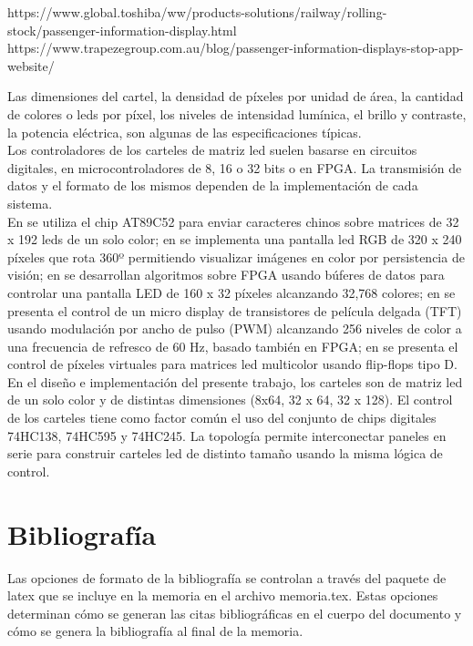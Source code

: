 https://www.global.toshiba/ww/products-solutions/railway/rolling-stock/passenger-information-display.html
https://www.trapezegroup.com.au/blog/passenger-information-displays-stop-app-website/

Las dimensiones del cartel, la densidad de píxeles por unidad de área, la cantidad de colores o leds por píxel, los niveles de intensidad lumínica, el brillo y contraste, la potencia eléctrica, son algunas de las especificaciones típicas.\\

 Los controladores de los carteles de matriz led suelen basarse en circuitos digitales, en microcontroladores de 8, 16 o 32 bits o en FPGA. La transmisión de datos y el formato de los mismos dependen de la implementación de cada sistema.  \\

En \cite{b1} se utiliza el chip AT89C52 para enviar caracteres chinos sobre matrices de 32 x 192 leds de un solo color; en \cite{b2} se implementa una pantalla led RGB de 320 x 240 píxeles que rota 360º permitiendo visualizar imágenes en color por persistencia de visión; en \cite{b3} se desarrollan algoritmos sobre FPGA usando búferes de datos para controlar una pantalla LED de 160 x 32 píxeles alcanzando 32,768 colores; en \cite{b4} se presenta el control de un micro display de transistores de película delgada (TFT) usando modulación por ancho de pulso (PWM) alcanzando 256 niveles de color a una frecuencia de refresco de 60 Hz, basado también en FPGA; en \cite{b5} se presenta el control de píxeles virtuales para matrices led multicolor usando flip-flops tipo D. \\

En el diseño e implementación del presente trabajo, los carteles son de matriz led de un solo color y de distintas dimensiones (8x64, 32 x 64, 32 x 128). El control de los carteles tiene como factor común el uso del conjunto de chips digitales 74HC138, 74HC595 y 74HC245. La topología permite interconectar paneles en serie para construir carteles led de distinto tamaño usando la misma lógica de control. \\

\pagebreak
\section{Bibliografía}
\label{sec:biblio}

Las opciones de formato de la bibliografía se controlan a través del paquete de latex  que se incluye en la memoria en el archivo memoria.tex.  Estas opciones determinan cómo se generan las citas bibliográficas en el cuerpo del documento y cómo se genera la bibliografía al final de la memoria.

